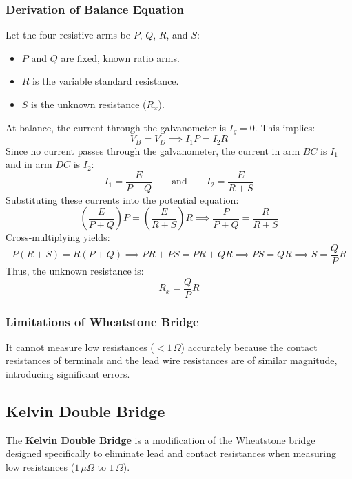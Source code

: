 \documentclass[12pt,a4paper]{article}
\begin{document}
\subsubsection{Derivation of Balance Equation}
Let the four resistive arms be $P$, $Q$, $R$, and $S$:
\begin{itemize}[leftmargin=*, itemsep=3pt]
  \item $P$ and $Q$ are fixed, known ratio arms.
  \item $R$ is the variable standard resistance.
  \item $S$ is the unknown resistance ($R_x$).
\end{itemize}
At balance, the current through the galvanometer is $I_g = 0$. This implies:
\begin{equation}
  V_B = V_D \implies I_1 P = I_2 R
\end{equation}
Since no current passes through the galvanometer, the current in arm $BC$ is $I_1$ and in arm $DC$ is $I_2$:
\begin{equation}
  I_1 = \frac{E}{P + Q} \qquad \text{and} \qquad I_2 = \frac{E}{R + S}
\end{equation}
Substituting these currents into the potential equation:
\begin{equation}
  \left(\frac{E}{P + Q}\right) P = \left(\frac{E}{R + S}\right) R \implies \frac{P}{P + Q} = \frac{R}{R + S}
\end{equation}
Cross-multiplying yields:
\begin{equation}
  P(R + S) = R(P + Q) \implies P R + P S = P R + Q R \implies P S = Q R \implies S = \frac{Q}{P} R
\end{equation}
Thus, the unknown resistance is:
\begin{equation}
  R_x = \frac{Q}{P} R
\end{equation}

\subsubsection{Limitations of Wheatstone Bridge}
It cannot measure low resistances ($< 1\,\Omega$) accurately because the contact resistances of terminals and the lead wire resistances are of similar magnitude, introducing significant errors.

\subsection{Kelvin Double Bridge}
The \textbf{Kelvin Double Bridge} is a modification of the Wheatstone bridge designed specifically to eliminate lead and contact resistances when measuring low resistances ($1\,\mu\Omega$ to $1\,\Omega$).
\end{document}
